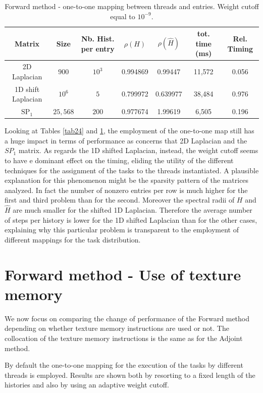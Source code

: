 \documentclass[a4paper,10pt]{article}
\begin{document}
\begin{table}[!h]
\hspace*{-1cm}
\begin{tabular}{|c|c|c|c|c|c|c|}
\hline
\textbf{Matrix} & \textbf{Size} &\textbf{Nb. Hist. per entry} & $\rho(H)$ 
& $\rho(\hat{H})$ & tot. time (ms) & Rel. Timing\\
\hline
2D Laplacian& $900$ & $10^3$ & 0.994869 & 0.99447 & 11,572 & 0.056\\
\hline 
1D shift Laplacian& $10^6$ & $5$ & 0.799972 & 0.639977 & 38,484 & 0.976\\
\hline
$\text{SP}_1$ & $25,568$ & $200$ & 0.977674 & 1.99619 & 6,505 & 0.196\\
\hline
\end{tabular}
\caption{Forward method - one-to-one mapping between threads and entries. 
Weight cutoff equal to $10^{-9}$.}
\label{tab25}
\end{table}

Looking at Tables \ref{tab24} and \ref{tab25}, the employment of 
the one-to-one map still has a huge impact in terms of performance as concerns 
that 2D Laplacian and the $SP_1$ matrix. As regards the 1D shifted Laplacian, 
instead, the weight cutoff seems to have e dominant effect on the timing, 
eliding the utility of the different techniques for the assignment of the tasks 
to the threads instantiated. A plausible explanation for this phenomenon might 
be 
the sparsity pattern of the matrices analyzed. In fact the number of nonzero 
entries per row is much higher for the first and third problem than for the 
second. Moreover the spectral radii of $H$ and $\hat{H}$ are much smaller for 
the shifted 1D Laplacian. Therefore the average 
number of steps per history is lower for the 1D shifted Laplacian than for the 
other cases, explaining why this particular problem is transparent to the 
employment of different mappings for the task distribution.


\section{Forward method - Use of texture memory}
We now focus on comparing the change of performance of the Forward method 
depending on whether texture memory instructions are used or not. 
The collocation of the texture memory instructions is the same as for the 
Adjoint method.

By default the one-to-one 
mapping for the execution of the tasks by different threads is employed. 
Results 
are shown both by resorting to a fixed length of the histories and also by 
using an adaptive weight cutoff.
\end{document}
